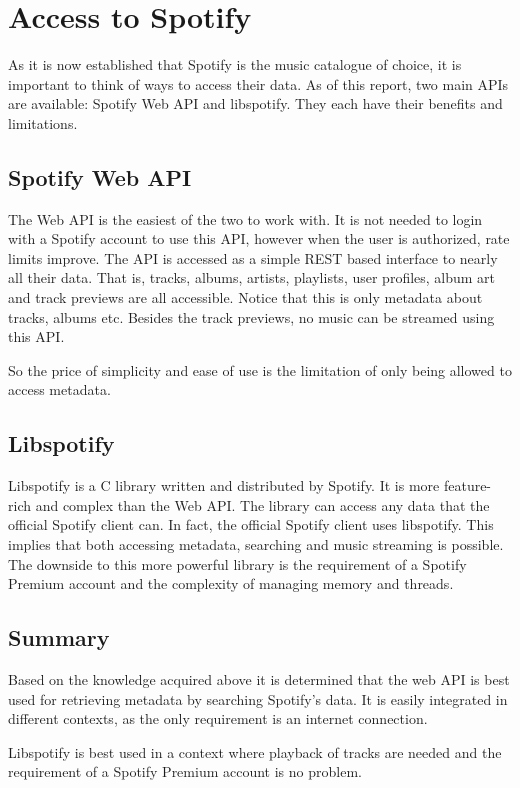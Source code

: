 \section{Access to Spotify}
\label{sub:Access_to_Spotify}

As it is now established that Spotify is the music catalogue of choice, it is important to think of ways to access their data. As of this report, two main APIs are available: Spotify Web API and libspotify. They each have their benefits and limitations.

\subsection{Spotify Web API}
\label{techPlat:music_catalog_web_api}

The Web API is the easiest of the two to work with. It is not needed to login with a Spotify account to use this API, however when the user is authorized, rate limits improve. The API is accessed as a simple REST based interface to nearly all their data. That is, tracks, albums, artists, playlists, user profiles, album art and track previews are all accessible. Notice that this is only metadata about tracks, albums etc. Besides the track previews, no music can be streamed using this API.

So the price of simplicity and ease of use is the limitation of only being allowed to access metadata.

\subsection{Libspotify}
\label{techPlat:music_catalog_libspotify}

Libspotify is a C library written and distributed by Spotify. It is more feature-rich and complex than the Web API. The library can access any data that the official Spotify client can. In fact, the official Spotify client uses libspotify. This implies that both accessing metadata, searching and music streaming is possible. The downside to this more powerful library is the requirement of a Spotify Premium account and the complexity of managing memory and threads.

\subsection{Summary}
\label{ssub:music_catalog_conclusion}

Based on the knowledge acquired above it is determined that the web API is best used for retrieving metadata by searching Spotify's data. It is easily integrated in different contexts, as the only requirement is an internet connection.

Libspotify is best used in a context where playback of tracks are needed and the requirement of a Spotify Premium account is no problem.
